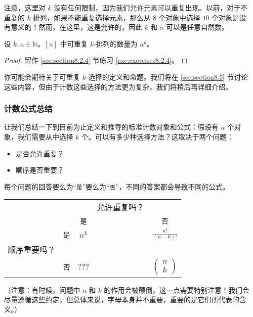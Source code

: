 注意，这里对 $k$ 没有任何限制，因为我们允许元素可以重复出现。以前，对于不重复的 $k$ 排列，如果不能重复选择元素，那么从 $8$ 个对象中选择 $10$ 个对象是没有意义的！然而，在这里，这是允许的，因此 $k$ 和 $n$ 可以是任意自然数。

\begin{proposition}\label{prop:proposition8.2.21}
    设 $k, n \in \mathbb{N}$。$[n]$ 中可重复 $k$-排列的数量为 $n^k$。
\end{proposition}

\begin{proof}
    留作 \ref{sec:section8.2.4} 节练习 \ref{exc:exercises8.2.4}。
\end{proof}

你可能会期待关于可重复 $k$-选择的定义和命题。我们将在 \ref{sec:section8.5} 节讨论这些内容，但由于计数这些选择的方法更为复杂，我们将稍后再详细介绍。

\subsubsection*{计数公式总结}\label{sec:section8.2.3}

让我们总结一下到目前为止定义和推导的标准计数对象和公式：假设有 $n$ 个对象，我们需要从中选择 $k$ 个。可以有多少种选择方法？这取决于两个问题：
\begin{itemize}
    \item 是否允许重复？
    \item 顺序是否重要？
\end{itemize}
每个问题的回答要么为``\verb|是|''要么为``\verb|否|''，不同的答案都会导致不同的公式。
\begin{center}
    \begin{tabular}{lcccc}
               &          &          & 允许重复吗？ &                                       \\
               &          & \verb|是| &        & \verb|否|                              \\
               & \verb|是| & $n^k$    &        & $\displaystyle \frac{n!}{(n-k)!}$     \\
        顺序重要吗？ &          &          &        &                                       \\
               & \verb|否| & ???      &        & $\begin{pmatrix}
                                                                               n \\
                                                                               k
                                                                           \end{pmatrix}$
    \end{tabular}
\end{center}
（注意：有时候，问题中 $n$ 和 $k$ 的作用会被颠倒，这一点需要特别注意！我们会尽量遵循这些约定，但总体来说，字母本身并不重要，重要的是它们所代表的含义。）


